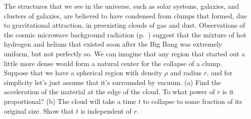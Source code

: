 The structures that we see in the universe, such as solar systems,
galaxies, and clusters of galaxies, are believed to have condensed
from clumps that formed, due to gravitational attraction, in preexisting
clouds of gas and dust. Observations of the cosmic microwave background
radiation (p.~\pageref{cmb}) suggest that the mixture of hot
hydrogen and helium that existed soon after the Big Bang was extremely
uniform, but not perfectly so. We can imagine that any region that started
out a little more dense would form a natural center for the collapse of
a clump. Suppose that we have a spherical region with density $\rho$
and radius $r$, and for simplicity let's just assume that it's surrounded
by vacuum. (a) Find the acceleration of the material at  the edge of the
cloud. To what power of $r$ is it proportional? 
\answercheck\hwendpart
(b) The cloud will take
a time $t$ to collapse to some fraction of its original size.
Show that $t$ is independent of $r$.

